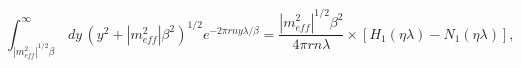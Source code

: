 \begin{equation}
\int _{\left|m_{eff}^{2}\right|^{1/2}\beta }^{\infty }\, dy\, \left(y^{2}+\left|m_{eff}^{2}\right|\beta ^{2}\right)^{1/2}e^{-2\pi rny\lambda /\beta }=\frac{\left|m_{eff}^{2}\right|^{1/2}\beta ^{2}}{4\pi rn\lambda }\times \left[H_{1}\left(\eta \lambda \right)-N_{1}\left(\eta \lambda \right)\right],\end{equation}

